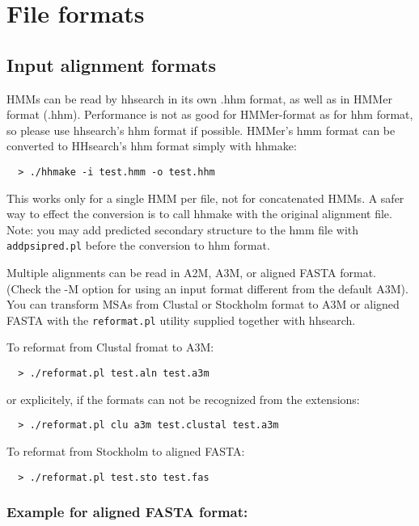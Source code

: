 \documentclass[11pt,a4paper]{article}
\begin{document}
\section{File formats}

\subsection{Input alignment formats}

HMMs can be read by hhsearch in its own .hhm format, as well as in HMMer format (.hhm).
Performance is not as good for HMMer-format as for hhm format, so please use 
hhsearch's hhm format if possible. HMMer's hmm format can be converted to HHsearch's 
hhm format simply with hhmake:
\begin{verbatim}
  > ./hhmake -i test.hmm -o test.hhm
\end{verbatim}

This works only for a single HMM per file, not for concatenated HMMs. A safer way to 
effect the conversion is to call hhmake with the original alignment file. Note: you 
may add predicted secondary structure to the hmm file with \verb`addpsipred.pl` before the 
conversion to hhm format.


Multiple alignments can be read in A2M, A3M, or aligned FASTA format. (Check the -M option for 
using an input format different from the default A3M). You can transform MSAs 
from Clustal or Stockholm format to A3M or aligned FASTA with the \verb`reformat.pl` utility 
supplied together with hhsearch. 

To reformat from Clustal fromat to A3M:
\begin{verbatim}
  > ./reformat.pl test.aln test.a3m
\end{verbatim}
or explicitely, if the formats can not be recognized from the extensions:
\begin{verbatim}
  > ./reformat.pl clu a3m test.clustal test.a3m
\end{verbatim}
To reformat from Stockholm to aligned FASTA:
\begin{verbatim}
  > ./reformat.pl test.sto test.fas
\end{verbatim}


\subsubsection*{Example for aligned FASTA format:}
\end{document}
